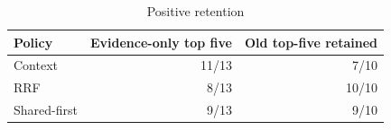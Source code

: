 \begin{table}[t]
\centering
\caption{Positive retention}
\label{tab:tradeoff}
\small
\setlength{\tabcolsep}{3.5pt}
\begin{tabular}{lrr}
\toprule
Policy & Evidence-only top five & Old top-five retained \\
\midrule
Context & 11/13 & 7/10 \\
RRF & 8/13 & 10/10 \\
Shared-first & 9/13 & 9/10 \\
\bottomrule
\end{tabular}
\end{table}
